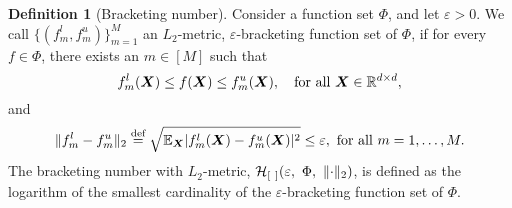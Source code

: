 \documentclass[11pt]{article}
\theoremstyle{plain}
\theoremstyle{definition}
\newtheorem{defn}{Definition}
\begin{document}
\begin{defn}[Bracketing number]\label{pro:inftynorm}
Consider a function set $\Phi$, and let $\varepsilon>0$. We call $\{(f^l_m,f^u_m)\}_{m=1}^M$ an $L_2$-metric, $\varepsilon$-bracketing function set of $\Phi$, if for every $f\in \Phi$, there exists an $m\in[M]$ such that 
\[
f^l_m(\bm X)\leq f(\bm X)\leq f^u_m(\bm X),\quad \text{for all }\bm X\in\mathbb{R}^{d\times d},
\]
and
\[
\lVert f^l_m-f^u_m\rVert_2\stackrel{\text{def}}{=}\sqrt{\mathbb{E}_{\bm X}|f^l_m(\bm X)-f^u_m(\bm X)|^2} \leq \varepsilon, \ \text{for all } m=1,\ldots,M. 
\]
The bracketing number with $L_2$-metric, $\tH_{[\ ]}(\varepsilon,\ \Phi,\ \vnormSize{}{\cdot})$, is defined as the logarithm of the smallest cardinality of the $\varepsilon$-bracketing function set of $\Phi$.  
\end{defn}
\end{document}
